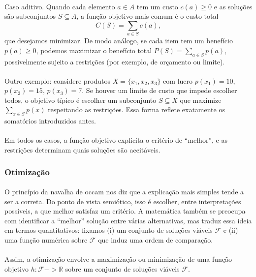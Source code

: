 \documentclass[12pt,a4paper]{article}
\def\emph#1{#1}%
\def\to{->}%
\begin{document}
\paragraph{}
Caso \emph{aditivo}. Quando cada elemento \(a\in A\) tem um custo \(c(a)\ge 0\) e as soluções são subconjuntos \(S\subseteq A\), a função objetivo mais comum é o custo total
\[C(S)=\sum_{a\in S} c(a),\]
que desejamos \emph{minimizar}. De modo análogo, se cada item tem um benefício \(p(a)\ge 0\), podemos \emph{maximizar} o benefício total \(P(S)=\sum_{a\in S} p(a)\), possivelmente sujeito a restrições (por exemplo, de orçamento ou limite).

\paragraph{}
Outro exemplo: considere produtos \(X=\{x_1,x_2,x_3\}\) com lucro \(p(x_1)=10\), \(p(x_2)=15\), \(p(x_3)=7\). Se houver um limite de custo que impede escolher todos, o objetivo típico é escolher um subconjunto \(S\subseteq X\) que maximize \(\sum_{x\in S} p(x)\) respeitando as restrições. Essa forma reflete exatamente os somatórios introduzidos antes.

\paragraph{}
Em todos os casos, a função objetivo explicita o critério de “melhor”, e as restrições determinam quais soluções são aceitáveis.

\subsubsection{Otimização}
\paragraph{}
O princípio da navalha de occam nos diz que a explicação mais simples tende a ser a correta. Do ponto de vista semiótico, isso é escolher, entre interpretações possíveis, a que melhor satisfaz um critério. A matemática também se preocupa com identificar a “melhor” solução entre várias alternativas, mas traduz essa ideia em termos quantitativos: fixamos (i) um conjunto de soluções viáveis \(\mathcal{F}\) e (ii) uma função numérica sobre \(\mathcal{F}\) que induz uma ordem de comparação.

\paragraph{}
Assim, a otimização envolve a maximização ou minimização de uma função objetivo \(h: \mathcal{F} \to \mathbb{R}\) sobre um conjunto de soluções viáveis \(\mathcal{F}\).
\end{document}
